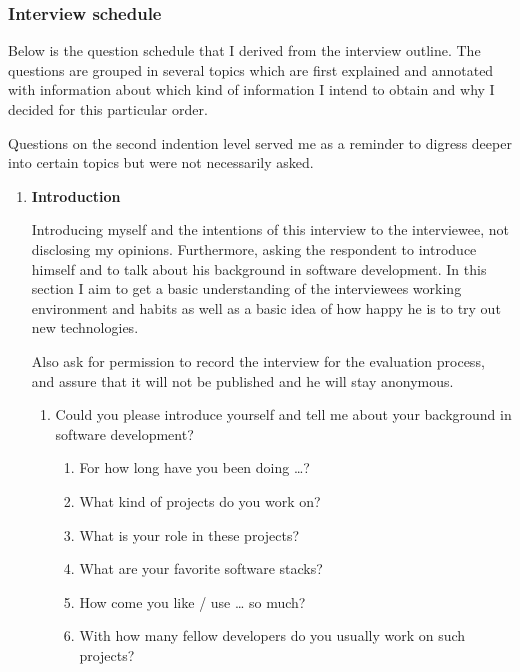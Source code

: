 \subsubsection{Interview schedule}

Below is the question schedule that I derived from the interview outline. The questions are grouped in several topics which are first explained and annotated with information about which kind of information I intend to obtain and why I decided for this particular order.

Questions on the second indention level served me as a reminder to digress deeper into certain topics but were not necessarily asked.

\begin{enumerate}

	\item \textbf{Introduction}

	Introducing myself and the intentions of this interview to the interviewee, not disclosing my opinions. Furthermore, asking the respondent to introduce himself and to talk about his background in software development. In this section I aim to get a basic understanding of the interviewees working environment and habits as well as a basic idea of how happy he is to try out new technologies.

	Also ask for permission to record the interview for the evaluation process, and assure that it will not be published and he will stay anonymous.

	\begin{enumerate}

		\item Could you please introduce yourself and tell me about your background in software development?

		\begin{enumerate}

			\item For how long have you been doing …?

			\item What kind of projects do you work on?

			\item What is your role in these projects?

			\item What are your favorite software stacks?

			\item How come you like / use … so much?

			\item With how many fellow developers do you usually work on such projects?


\end{enumerate}
\end{enumerate}
\end{enumerate}
